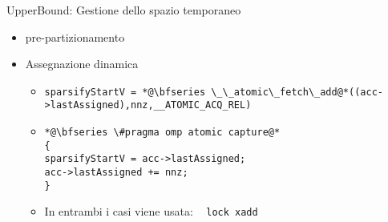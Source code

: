 \begin{frame}[fragile] {UpperBound: Gestione dello spazio temporaneo}
\begin{itemize}
	\item	pre-partizionamento
	\item	Assegnazione dinamica
	\begin{itemize}
		\item	
		\begin{lstlisting}
sparsifyStartV = *@\bfseries \_\_atomic\_fetch\_add@*((acc->lastAssigned),nnz,__ATOMIC_ACQ_REL)
		\end{lstlisting}
		\item	
		\begin{lstlisting}
*@\bfseries \#pragma omp atomic capture@*
{ 
sparsifyStartV = acc->lastAssigned;
acc->lastAssigned += nnz;
}
		\end{lstlisting}
		\item In entrambi i casi viene usata:   \verb|lock xadd|
	\end{itemize}
\end{itemize}
%
%
\end{frame}

